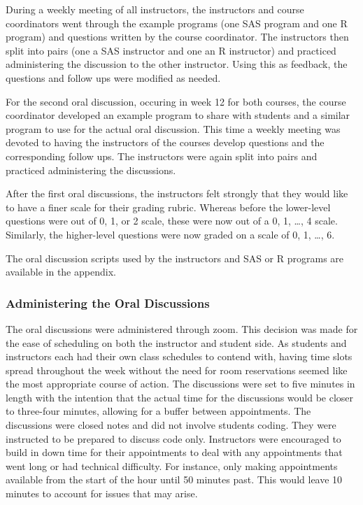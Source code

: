 \documentclass[
  letterpaper,
  DIV=11,
  numbers=noendperiod]{scrartcl}
\begin{document}
During a weekly meeting of all instructors, the instructors and course
coordinators went through the example programs (one SAS program and one
R program) and questions written by the course coordinator. The
instructors then split into pairs (one a SAS instructor and one an R
instructor) and practiced administering the discussion to the other
instructor. Using this as feedback, the questions and follow ups were
modified as needed.

For the second oral discussion, occuring in week 12 for both courses,
the course coordinator developed an example program to share with
students and a similar program to use for the actual oral discussion.
This time a weekly meeting was devoted to having the instructors of the
courses develop questions and the corresponding follow ups. The
instructors were again split into pairs and practiced administering the
discussions.

After the first oral discussions, the instructors felt strongly that
they would like to have a finer scale for their grading rubric. Whereas
before the lower-level questions were out of 0, 1, or 2 scale, these
were now out of a 0, 1, \ldots, 4 scale. Similarly, the higher-level
questions were now graded on a scale of 0, 1, \ldots, 6.

The oral discussion scripts used by the instructors and SAS or R
programs are available in the appendix.

\hypertarget{administering-the-oral-discussions}{%
\subsubsection{Administering the Oral
Discussions}\label{administering-the-oral-discussions}}

The oral discussions were administered through zoom. This decision was
made for the ease of scheduling on both the instructor and student side.
As students and instructors each had their own class schedules to
contend with, having time slots spread throughout the week without the
need for room reservations seemed like the most appropriate course of
action. The discussions were set to five minutes in length with the
intention that the actual time for the discussions would be closer to
three-four minutes, allowing for a buffer between appointments. The
discussions were closed notes and did not involve students coding. They
were instructed to be prepared to discuss code only. Instructors were
encouraged to build in down time for their appointments to deal with any
appointments that went long or had technical difficulty. For instance,
only making appointments available from the start of the hour until 50
minutes past. This would leave 10 minutes to account for issues that may
arise.
\end{document}
